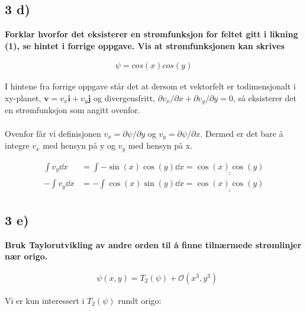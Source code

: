 \subsection*{3 d)}
\textbf{Forklar hvorfor det eksisterer en strømfunksjon for
feltet gitt i likning (1), se hintet i forrige oppgave.
 Vis at strømfunksjonen kan skrives }

 \begin{align}
    \psi = cos(x)cos(y)
 \end{align}

I hintene fra forrige oppgave står det at dersom et vektorfelt
er todimensjonalt i xy-planet, $\mathbf{v} = v_x \mathbf{i}
+ v_y \mathbf{j}$ og divergensfritt, $\partial v_x /\partial x
+  \partial v_y /\partial y = 0$, så eksisterer det en
 strømfunksjon som angitt ovenfor.
\\
\\
Ovenfor får vi definisjonen $v_x = \partial \psi /\partial y$
og $v_y = \partial \psi /\partial x$. Dermed er det bare å integre $v_x$
med hensyn på y og $v_y$ med hensyn på x.


\begin{align*}
    \int v_y \dd x
    &= \int - \sin(x)\cos(y) \dd x
    = \underline{\underline{\cos(x)\cos(y)}}
    \\
    - \int v_y \dd x
    &= - \int \cos(x)\sin(y) \dd x
    = \underline{\underline{\cos(x)\cos(y)}}
\end{align*}




















\pagebreak
\subsection*{3 e)}

\textbf{Bruk Taylorutvikling av andre orden til å
 finne tilnærmede strømlinjer nær origo.}


\begin{align*}
    &\psi(x,y) = T_2(\psi) + \mathcal{O}(x^3,y^3)
\end{align*}

Vi er kun interessert i $T_2(\psi)$ rundt origo:

